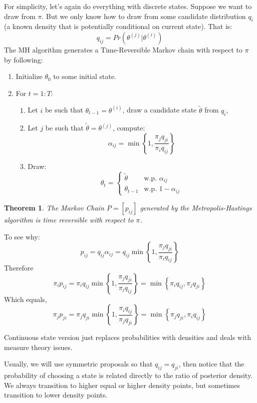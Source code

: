 \documentclass[twoside]{article}
\newcounter{lecnum}
\newtheorem{theorem}{Theorem}[lecnum]
\begin{document}
For simplicity, let's again do everything with discrete states. 
Suppose we want to draw from $\pi$. But we only know how to draw from some candidate distribution $q_i$ (a known density that is potentially conditional on current state). 
That is: 
$$q_{ij} = Pr( \theta^{(j)} | \theta^{(i)})$$ 
The MH algorithm generates a Time-Reversible Markov chain with respect to $\pi$ by following: 
\begin{enumerate}
\item Initialize $\theta_0$ to some initial state. 
\item For $t = 1:T$:
\begin{enumerate}
\item Let $i$ be such that $\theta_{t-1} = \theta^{(i)}$, draw a candidate state $\tilde{\theta}$ from $q_i$,  
\item Let $j$ be such that $\tilde{\theta} = \theta^{(j)}$, compute: $$\alpha_{ij} = \min\left\{ 1, \frac{\pi_j q_{ji}}{\pi_i q_{ij}} \right\}$$
\item Draw: 
$$\theta_t = \begin{cases}  \tilde{\theta} & \mbox{w.p. } \alpha_{ij} \\  \theta_{t-1} & \mbox{w.p. }  1 - \alpha_{ij} \end{cases} $$
\end{enumerate}
\end{enumerate}

\begin{theorem}
The Markov Chain $P = [p_{ij}]$ generated by the Metropolis-Hastings algorithm is time reversible with respect to $\pi$. 
\end{theorem}

To see why: 
$$ p_{ij} = q_{ij}\alpha_{ij} = q_{ij} \min\left\{ 1, \frac{\pi_j q_{ji}}{\pi_i q_{ij}} \right\} $$
Therefore
$$\pi_i p_{ij} = \pi_i q_{ij} \min\left\{ 1, \frac{\pi_j q_{ji}}{\pi_i q_{ij}} \right\} = \min\left\{ \pi_i q_{ij} , \pi_j q_{ji} \right\}$$
Which equals, 
$$\pi_j p_{ji} = \pi_j q_{ji} \min\left\{ 1, \frac{\pi_i q_{ij}}{\pi_j q_{ji}} \right\} = \min\left\{ \pi_j q_{ji} , \pi_i q_{ij} \right\}$$

Continuous state version just replaces probabilities with densities and deals with measure theory issues.

Usually, we will use symmetric proposals so that $q_{ij} = q_{ji}$, then notice that the probability of choosing a state is related directly to the ratio of posterior density. We always transition to higher equal or higher density points, but sometimes transition to lower density points. 
\end{document}
